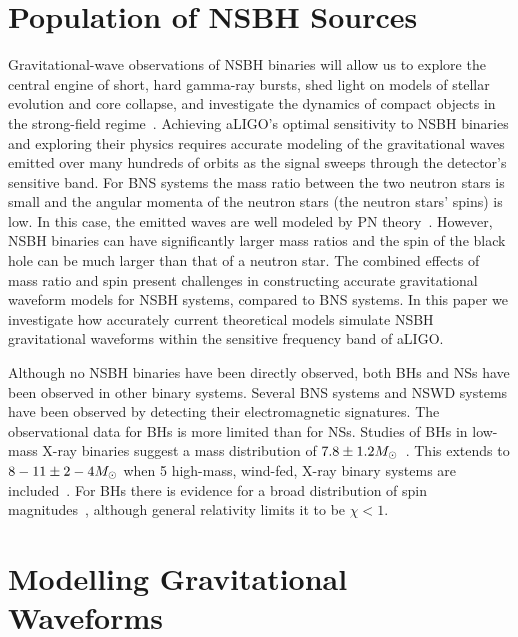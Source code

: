 \section{Population of NSBH Sources}

Gravitational-wave observations of \ac{NSBH} binaries will allow us to explore the central engine of short,
hard gamma-ray bursts, shed light on models of stellar evolution and core
collapse, and investigate the dynamics of compact objects in the strong-field regime~\cite{lrr-2009-2, Eichler:1989ve, Narayan:1992iy, Paczynski:1991aq, Berger:2010qx, Fryer:2011cx, Hannam:2013uu}.
Achieving aLIGO's optimal sensitivity to
\ac{NSBH} binaries and exploring their physics 
requires accurate modeling of the gravitational waves emitted 
over many hundreds of orbits as the signal sweeps through the detector's
sensitive band. For \ac{BNS} systems the mass
ratio between the two neutron stars is small and the angular momenta of the
neutron stars (the neutron stars' spins) is low. In this case, the emitted waves are
well modeled by \ac{PN}
theory~\cite{Blanchet:2006zz,Buonanno:2009zt,Brown:2012qf}. 
However, \ac{NSBH} binaries can have significantly larger mass ratios and the spin of
the black hole can be much larger than that of a neutron star. The combined
effects of mass ratio and spin present challenges in constructing accurate gravitational waveform models for
\ac{NSBH} systems, compared to \ac{BNS} systems.  In this paper we
investigate how accurately current theoretical models simulate \ac{NSBH} gravitational waveforms
within the sensitive frequency band of \ac{aLIGO}.

Although no \ac{NSBH} binaries have been directly observed, both \acp{BH} and \acp{NS}
have been observed in other binary systems. Several \ac{BNS} systems and
\ac{NSWD} systems have been observed by detecting their electromagnetic
signatures.  The observational data for \acp{BH} is more limited
than for \acp{NS}.  Studies of \acp{BH} in low-mass X-ray
binaries suggest a mass distribution of $7.8 \pm 1.2 M_\odot$~\cite{Ozel:2010su}. This extends to $8-11 \pm 2-4 M_\odot$ when 5
high-mass, wind-fed, X-ray binary systems are included~\cite{Farr:2010tu}. For
\acp{BH} there is evidence for a broad distribution of spin
magnitudes~\cite{Miller:2009cw}, although general relativity limits it to be
$\chi < 1$. 

\section{Modelling Gravitational Waveforms}

